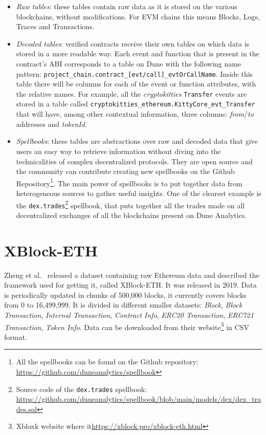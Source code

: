 \begin{itemize}
    \item \textit{Raw tables}: these tables contain raw data as it is stored on the various blockchains, without modifications. For EVM chains this means Blocks, Logs, Traces and Transactions.
    \item \textit{Decoded tables}: verified contracts receive their own tables on which data is stored in a more readable way. Each event and function that is present in the contract's ABI corresponds to a table on Dune with the following name pattern: \texttt{project\_chain.contract\_[evt/call]\_evtOrCallName}. Inside this table there will be columns for each of the event or function attributes, with the relative names. For example, all the \textit{cryptokitties} \texttt{Transfer} events are stored in a table called \texttt{cryptokitties\_ethereum.KittyCore\_evt\_Transfer} that will have, among other contextual information, three columns: \textit{from}/\textit{to} addresses and \textit{tokenId}.
    \item \textit{Spellbooks}: these tables are abstractions over raw and decoded data that give users an easy way to retrieve information without diving into the technicalities of complex decentralized protocols. They are open source and the community can contribute creating new spellbooks on the Github Repository\footnote{All the spellbooks can be found on the Github repository: \url{https://github.com/duneanalytics/spellbook}}. The main power of spellbooks is to put together data from heterogeneous sources to gather useful insights. One of the clearest example is the \texttt{dex.trades}\footnote{Source code of the \texttt{dex.trades} spellbook: \url{https://github.com/duneanalytics/spellbook/blob/main/models/dex/dex\_trades.sql}} spellbook, that puts together all the trades made on all decentralized exchanges of all the blockchains present on Dune Analytics.
\end{itemize}

\section{XBlock-ETH}

Zheng et al.~\cite{xblock-eth} released a dataset containing raw Ethereum data and described the framework used for getting it, called XBlock-ETH. It was released in 2019. Data is periodically updated in chunks of 500,000 blocks, it currently covers blocks from 0 to 16,499,999. It is divided in different smaller datasets: \textit{Block}, \textit{Block Transaction}, \textit{Internal Transaction}, \textit{Contract Info}, \textit{ERC20 Transaction}, \textit{ERC721 Transaction}, \textit{Token Info}. Data can be downloaded from their website\footnote{Xbloxk website where it\url{https://xblock.pro/xblock-eth.html}} in CSV format.

